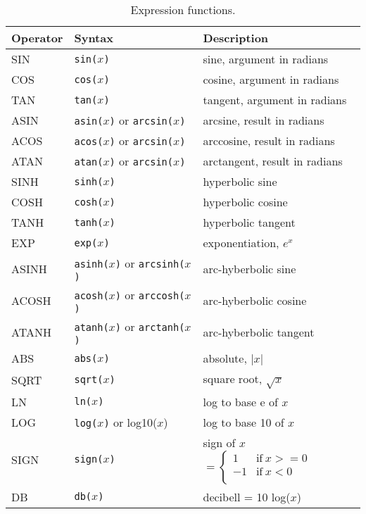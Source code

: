 \begin{table}
\caption{Expression functions.\label{table:expression:functions}}
\begin{center}
\begin{tabular}{|l|l|l|}
\hline
{\bf Operator }	& {\bf   Syntax } & {\bf Description}  \\
\hline
SIN		&{\tt sin($x$)}	& sine, argument in radians \\
COS		& {\tt cos($x$)}	& cosine, argument in radians \\
TAN		& {\tt tan($x$)}	& tangent, argument in radians \\
ASIN		& {\tt asin($x$)} or {\tt arcsin($x$)}
					& arcsine, result in radians \\
ACOS		& {\tt acos($x$)} or {\tt arcsin($x$)}
					& arccosine, result in radians \\
ATAN		& {\tt atan($x$)} or {\tt arcsin($x$)}
					& arctangent, result in radians \\
SINH		& {\tt sinh($x$)}	& hyperbolic sine \\
COSH		& {\tt cosh($x$)}	& hyperbolic cosine \\
TANH		& {\tt tanh($x$)}	& hyperbolic tangent \\
EXP		& {\tt exp($x$)}	& exponentiation, $e^x$ \\
ASINH		& {\tt asinh($x$)} or {\tt arcsinh($x$)}
                                        & arc-hyberbolic sine \\
ACOSH		& {\tt acosh($x$)} or {\tt arccosh($x$)}
					& arc-hyberbolic cosine \\
ATANH		& {\tt atanh($x$)} or {\tt arctanh($x$)}
					& arc-hyberbolic tangent \\
ABS		& {\tt abs($x$)}	& absolute, $|x|$ \\
SQRT		& {\tt sqrt($x$)}	& square root, $\sqrt{x}$ \\
LN		& {\tt ln($x$)}		& log to base e of $x$ \\
LOG		& {\tt log($x$)} or log10($x$)	& log to base 10 of $x$ \\
SIGN		& {\tt sign($x$)}		& sign of $x$
						$= \left\{ \begin{array}{rl}
                                                   1 & \mbox{if}~ x >= 0 \\
                                                  -1 & \mbox{if}~ x<0 \\
				          	\end{array}  \right. $ \\ %
DB		& {\tt db($x$)}		& decibell  = 10 log($x$) \\

\end{tabular}
\end{center}
\end{table}
